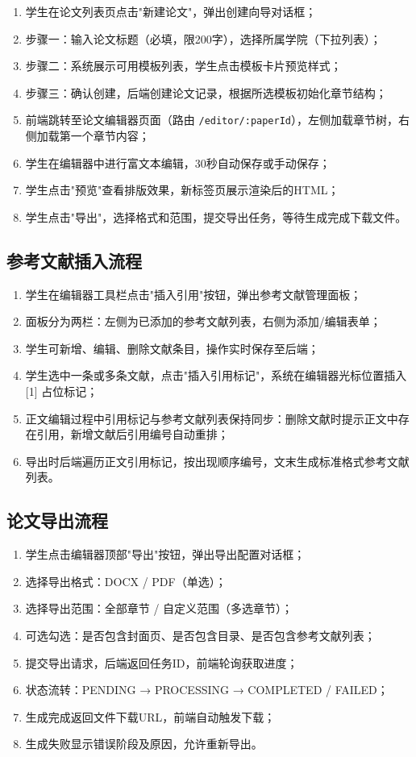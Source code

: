 \begin{enumerate}
    \item 学生在论文列表页点击"新建论文"，弹出创建向导对话框；
    \item 步骤一：输入论文标题（必填，限200字），选择所属学院（下拉列表）；
    \item 步骤二：系统展示可用模板列表，学生点击模板卡片预览样式；
    \item 步骤三：确认创建，后端创建论文记录，根据所选模板初始化章节结构；
    \item 前端跳转至论文编辑器页面（路由 \texttt{/editor/:paperId}），左侧加载章节树，右侧加载第一个章节内容；
    \item 学生在编辑器中进行富文本编辑，30秒自动保存或手动保存；
    \item 学生点击"预览"查看排版效果，新标签页展示渲染后的HTML；
    \item 学生点击"导出"，选择格式和范围，提交导出任务，等待生成完成下载文件。
\end{enumerate}

\subsection{参考文献插入流程}

\begin{enumerate}
    \item 学生在编辑器工具栏点击"插入引用"按钮，弹出参考文献管理面板；
    \item 面板分为两栏：左侧为已添加的参考文献列表，右侧为添加/编辑表单；
    \item 学生可新增、编辑、删除文献条目，操作实时保存至后端；
    \item 学生选中一条或多条文献，点击"插入引用标记"，系统在编辑器光标位置插入 [1] 占位标记；
    \item 正文编辑过程中引用标记与参考文献列表保持同步：删除文献时提示正文中存在引用，新增文献后引用编号自动重排；
    \item 导出时后端遍历正文引用标记，按出现顺序编号，文末生成标准格式参考文献列表。
\end{enumerate}

\subsection{论文导出流程}

\begin{enumerate}
    \item 学生点击编辑器顶部"导出"按钮，弹出导出配置对话框；
    \item 选择导出格式：DOCX / PDF（单选）；
    \item 选择导出范围：全部章节 / 自定义范围（多选章节）；
    \item 可选勾选：是否包含封面页、是否包含目录、是否包含参考文献列表；
    \item 提交导出请求，后端返回任务ID，前端轮询获取进度；
    \item 状态流转：PENDING → PROCESSING → COMPLETED / FAILED；
    \item 生成完成返回文件下载URL，前端自动触发下载；
    \item 生成失败显示错误阶段及原因，允许重新导出。
\end{enumerate}

